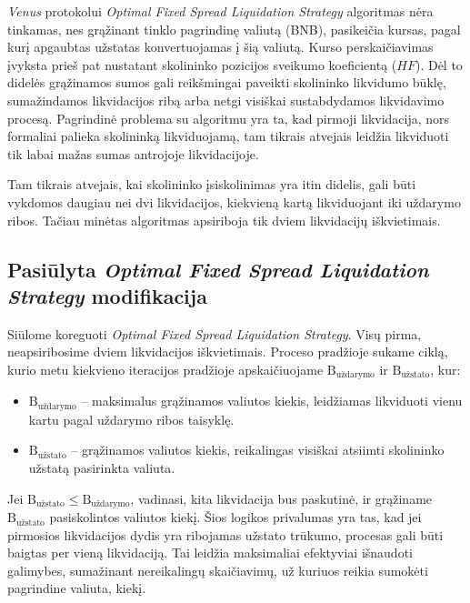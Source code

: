 \documentclass[]{VUMIFTemplateClass}
\begin{document}
\textit{Venus} protokolui \textit{Optimal Fixed Spread Liquidation Strategy} algoritmas nėra tinkamas, nes grąžinant tinklo pagrindinę valiutą (BNB), pasikeičia kursas, pagal kurį apgaubtas užstatas konvertuojamas į šią valiutą. Kurso perskaičiavimas įvyksta prieš pat nustatant skolininko pozicijos sveikumo koeficientą ($HF$). Dėl to didelės grąžinamos sumos gali reikšmingai paveikti skolininko likvidumo būklę, sumažindamos likvidacijos ribą arba netgi visiškai sustabdydamos likvidavimo procesą. Pagrindinė problema su algoritmu yra ta, kad pirmoji likvidacija, nors formaliai palieka skolininką likviduojamą, tam tikrais atvejais leidžia likviduoti tik labai mažas sumas antrojoje likvidacijoje.

Tam tikrais atvejais, kai skolininko įsiskolinimas yra itin didelis, gali būti vykdomos daugiau nei dvi likvidacijos, kiekvieną kartą likviduojant iki uždarymo ribos. Tačiau minėtas algoritmas apsiriboja tik dviem likvidacijų iškvietimais.

\subsection{Pasiūlyta \textit{Optimal Fixed Spread Liquidation Strategy} modifikacija}

Siūlome koreguoti \textit{Optimal Fixed Spread Liquidation Strategy}. Visų pirma, neapsiribosime dviem likvidacijos iškvietimais. Proceso pradžioje sukame ciklą, kurio metu kiekvieno iteracijos pradžioje apskaičiuojame $\text{B}_{\text{uždarymo}}$ ir $\text{B}_{\text{užstato}}$, kur:

\begin{itemize}
\item $\text{B}_{\text{uždarymo}}$ – maksimalus grąžinamos valiutos kiekis, leidžiamas likviduoti vienu kartu pagal uždarymo ribos taisyklę.
\item $\text{B}_{\text{užstato}}$ – grąžinamos valiutos kiekis, reikalingas visiškai atsiimti skolininko užstatą pasirinkta valiuta.
\end{itemize}

Jei $\text{B}_{\text{užstato}} \leq \text{B}_{\text{uždarymo}}$, vadinasi, kita likvidacija bus paskutinė, ir grąžiname $\text{B}_{\text{užstato}}$ pasiskolintos valiutos kiekį. Šios logikos privalumas yra tas, kad jei pirmosios likvidacijos dydis yra ribojamas užstato trūkumo, procesas gali būti baigtas per vieną likvidaciją. Tai leidžia maksimaliai efektyviai išnaudoti galimybes, sumažinant nereikalingų skaičiavimų, už kuriuos reikia sumokėti pagrindine valiuta, kiekį.
\end{document}
